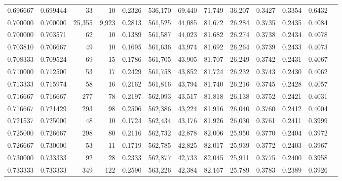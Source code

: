 \begin{tabular}{rrrrrrrrrrrrr}
0.696667 & 0.699444 &     33 &     10 &                                     0.2326 & 536,170 &  69,440 &  71,749 &  36,207 & 0.3427 & 0.3354 & 0.6432 \\
0.700000 & 0.700000 & 25,355 &  9,923 &                                     0.2813 & 561,525 &  44,085 &  81,672 &  26,284 & 0.3735 & 0.2435 & 0.4084 \\
0.700000 & 0.703571 &     62 &     10 &                                     0.1389 & 561,587 &  44,023 &  81,682 &  26,274 & 0.3738 & 0.2434 & 0.4078 \\
0.703810 & 0.706667 &     49 &     10 &                                     0.1695 & 561,636 &  43,974 &  81,692 &  26,264 & 0.3739 & 0.2433 & 0.4073 \\
0.708333 & 0.709524 &     69 &     15 &                                     0.1786 & 561,705 &  43,905 &  81,707 &  26,249 & 0.3742 & 0.2431 & 0.4067 \\
0.710000 & 0.712500 &     53 &     17 &                                     0.2429 & 561,758 &  43,852 &  81,724 &  26,232 & 0.3743 & 0.2430 & 0.4062 \\
0.713333 & 0.715974 &     58 &     16 &                                     0.2162 & 561,816 &  43,794 &  81,740 &  26,216 & 0.3745 & 0.2428 & 0.4057 \\
0.716667 & 0.716667 &    277 &     78 &                                     0.2197 & 562,093 &  43,517 &  81,818 &  26,138 & 0.3752 & 0.2421 & 0.4031 \\
0.716667 & 0.721429 &    293 &     98 &                                     0.2506 & 562,386 &  43,224 &  81,916 &  26,040 & 0.3760 & 0.2412 & 0.4004 \\
0.721537 & 0.725000 &     48 &     10 &                                     0.1724 & 562,434 &  43,176 &  81,926 &  26,030 & 0.3761 & 0.2411 & 0.3999 \\
0.725000 & 0.726667 &    298 &     80 &                                     0.2116 & 562,732 &  42,878 &  82,006 &  25,950 & 0.3770 & 0.2404 & 0.3972 \\
0.726667 & 0.730000 &     53 &     11 &                                     0.1719 & 562,785 &  42,825 &  82,017 &  25,939 & 0.3772 & 0.2403 & 0.3967 \\
0.730000 & 0.733333 &     92 &     28 &                                     0.2333 & 562,877 &  42,733 &  82,045 &  25,911 & 0.3775 & 0.2400 & 0.3958 \\
0.733333 & 0.733333 &    349 &    122 &                                     0.2590 & 563,226 &  42,384 &  82,167 &  25,789 & 0.3783 & 0.2389 & 0.3926 \\

\end{tabular}
